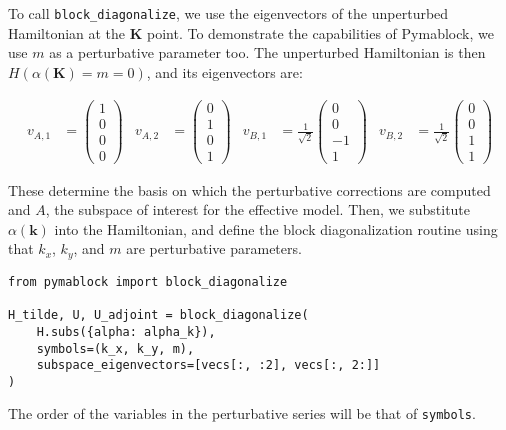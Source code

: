 \documentclass[submission, Codebases]{SciPost}
\begin{document}
{{%

To call \texttt{block\_diagonalize}, we use the eigenvectors of the unperturbed
Hamiltonian at the $\mathbf{K}$ point.
To demonstrate the capabilities of Pymablock, we use $m$ as a perturbative
parameter too.
The unperturbed Hamiltonian is then $H(\alpha(\mathbf{K}) = m = 0)$, and its
eigenvectors are:

\begin{equation}
\begin{align}
v_{A,1} &= \begin{pmatrix} 1 \\ 0 \\ 0 \\ 0 \end{pmatrix} &
v_{A,2} &= \begin{pmatrix} 0 \\ 1 \\ 0 \\ 1 \end{pmatrix} &
v_{B,1} &= \frac{1}{\sqrt{2}} \begin{pmatrix} 0 \\ 0 \\ -1 \\ 1 \end{pmatrix} &
v_{B,2} &= \frac{1}{\sqrt{2}} \begin{pmatrix} 0 \\ 0 \\ 1 \\ 1 \end{pmatrix}
\end{align}
\end{equation}

These determine the basis on which the perturbative corrections are computed
and $A$, the subspace of interest for the effective model.
Then, we substitute $\alpha(\mathbf{k})$ into the Hamiltonian, and define the
block diagonalization routine using that $k_x$, $k_y$, and $m$ are perturbative
parameters.

\begin{verbatim}
from pymablock import block_diagonalize

H_tilde, U, U_adjoint = block_diagonalize(
    H.subs({alpha: alpha_k}),
    symbols=(k_x, k_y, m),
    subspace_eigenvectors=[vecs[:, :2], vecs[:, 2:]]
)
\end{verbatim}

The order of the variables in the perturbative series will be that of \texttt{symbols}.

}}
\end{document}
